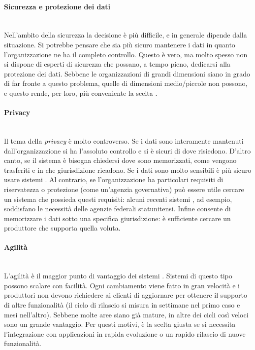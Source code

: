 \paragraph{Sicurezza e protezione dei dati} \mbox{} \\
Nell'ambito della sicurezza la decisione è più difficile, e in generale dipende dalla situazione. Si potrebbe pensare che sia più sicuro mantenere i dati  in quanto l'organizzazione ne ha il completo controllo. Questo è vero, ma molto spesso non si dispone di esperti di sicurezza che possano, a tempo pieno, dedicarsi alla protezione dei dati. Sebbene le organizzazioni di grandi dimensioni siano in grado di far fronte a questo problema, quelle di dimensioni medio/piccole non possono, e questo rende, per loro, più conveniente la scelta . 

\paragraph{Privacy} \mbox{} \\
Il tema della \textit{privacy} è molto controverso. Se i dati sono interamente mantenuti dall'organizzazione si ha l'assoluto controllo e si è sicuri di dove risiedono. D'altro canto, se il sistema è  bisogna chiedersi dove sono memorizzati, come vengono trasferiti e in che giurisdizione ricadono. Se i dati sono molto sensibili è più sicuro usare sistemi . Al contrario, se l'organizzazione ha particolari requisiti di riservatezza o protezione (come un'agenzia governativa) può essere utile cercare un sistema  che possieda questi requisiti: alcuni recenti sistemi , ad esempio, soddisfano le necessità delle agenzie federali statunitensi. Infine  consente di memorizzare i dati sotto una specifica giurisdizione: è sufficiente cercare un produttore che supporta quella voluta.

\paragraph{Agilità} \mbox{} \\
L'agilità è il maggior punto di vantaggio dei sistemi . Sistemi di questo tipo possono scalare con facilità. Ogni cambiamento viene fatto in gran velocità e i produttori non devono richiedere ai clienti di aggiornare per ottenere il supporto di altre funzionalità (il ciclo di rilascio si misura in settimane nel primo caso e mesi nell'altro). Sebbene molte aree siano già mature, in altre dei cicli così veloci sono un grande vantaggio. Per questi motivi,  è la scelta giusta se si necessita l'integrazione con applicazioni in rapida evoluzione o un rapido rilascio di nuove funzionalità. 

